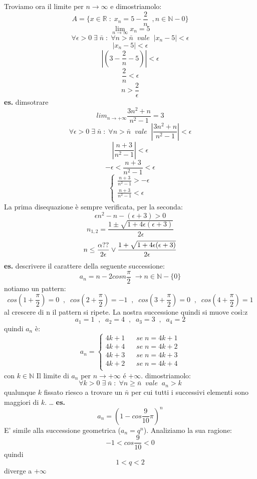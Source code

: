 \newline
Troviamo ora il limite per $n \rightarrow \infty$ e dimostriamolo:
\[
    A = \{x \in \mathbb{R} \;:\; x_n = 5-\frac{2}{n} \;\;, n\in \mathbb{N} -{0}\}
\]
\[
    \lim_{n \rightarrow \infty} x_n = 5
\]
\[
    \forall \epsilon > 0 \;\exists\; \bar{n} \;:\; \forall n > \bar{n} \;\;vale\;\; |x_n-5| < \epsilon 
\]
\[
    |x_n-5| <\epsilon 
\]
\[
    |(3-\frac{2}{n}- 5)| < \epsilon
\]
\[
    \frac{2}{n}< \epsilon
\]
\[
    n> \frac{2}{\epsilon}
\]
\newline
\newline
\textbf{es.} dimsotrare
\[
    lim_{n\rightarrow+\infty} \frac{3n^2 +n}{n^2-1} = 3
\]
\[
    \forall \epsilon > 0 \;\exists\; \bar{n} \;:\; \forall n > \bar{n} \;\;vale\;\; |\frac{3n^2 +n}{n^2-1}| <\epsilon 
\]
\[
    |\frac{n+3}{n^2-1}|<\epsilon
\]
\[
    -\epsilon< \frac{n+3}{n^2-1}< \epsilon
\]
\[
    \begin{cases}
        \frac{n+3}{n^2-1}>-\epsilon \\
        \frac{n+3}{n^2-1}< \epsilon \\
    \end{cases}
\]
La prima disequazione è sempre verificata, per la seconda:
\[
    \epsilon n^2 - n -(\epsilon + 3) > 0
\]
\[
    n_{1,2} = \frac{1 \pm \sqrt{1+4\epsilon(\epsilon+3)}}{2\epsilon}
\]
\[
    n \leq \frac{\-\alpha ??}{2\epsilon} \lor \frac{1+\sqrt{1+4\epsilon(\epsilon+3)}}{2\epsilon}
\]
\newline
\newline
\textbf{es.} descrivere il carattere della seguente successione:
\[
    a_n = n-2 cos n \frac{\pi}{2} \;\rightarrow n\in \mathbb{N}- \{0\}
\]
notiamo un pattern:
\[
    cos(1+ \frac{\pi}{2}) = 0 \;\;,\;\;
    cos(2+ \frac{\pi}{2}) = -1 \;\;,\;\;
    cos(3+ \frac{\pi}{2}) = 0 \;\;,\;\;
    cos(4+ \frac{\pi}{2}) = 1
\]
al crescere di n il pattern si ripete. La nostra successione quindi si muove così:z
\[
    a_1 = 1 \;\;,\;\;
    a_2 = 4 \;\;,\;\;
    a_3 = 3 \;\;,\;\;
    a_4 = 2
\]
quindi $a_n$ è:
\[
    a_n = 
    \begin{cases}
        4k+1 \;\;\;&se \;n= 4k+1 \\
        4k+4 \;\;\;&se \;n = 4k+2\\
        4k+3 \;\;\;&se \;n= 4k+3\\
        4k+2 \;\;\;&se \;n= 4k+4\\
    \end{cases}
\]
con $k \in \mathbb{N}$
\newline
Il limite di $a_n$ per $n\rightarrow +\infty$ é $+\infty$.
\newline
dimostriamolo:
\[
    \forall k>0 \;\exists\; \bar{n} \;:\; \forall n \geq \bar{n} \;\;vale\;\; a_n> k
\]
qualunque $k$ fissato riesco a trovare un $\bar{n}$ per cui tutti i successivi elementi sono maggiori di $k$.
 \dots
\newline
\newline
\newline
\textbf{es.} 
\[
    a_n = (1-cos \frac{9}{10}\pi )^n
\]
E' simile alla successione geometrica ($a_n = q^n$).
\newline
Analiziamo la sua ragione:
\[
    -1 < cos \frac{9}{10} < 0
\]
quindi
\[
    1<q<2  
\]
diverge a $+\infty$